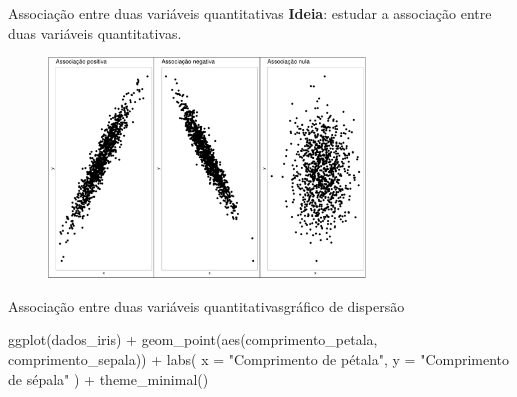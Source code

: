 \documentclass[
  10pt,
  ignorenonframetext,
]{beamer}
\newenvironment{Shaded}{\begin{snugshade}}{\end{snugshade}}
\newcommand{\AttributeTok}[1]{\textcolor[rgb]{0.40,0.45,0.13}{#1}}
\newcommand{\FunctionTok}[1]{\textcolor[rgb]{0.28,0.35,0.67}{#1}}
\newcommand{\NormalTok}[1]{\textcolor[rgb]{0.00,0.23,0.31}{#1}}
\newcommand{\SpecialCharTok}[1]{\textcolor[rgb]{0.37,0.37,0.37}{#1}}
\newcommand{\StringTok}[1]{\textcolor[rgb]{0.13,0.47,0.30}{#1}}
\begin{document}
\begin{frame}{Associação entre duas variáveis quantitativas}
\protect\hypertarget{associauxe7uxe3o-entre-duas-variuxe1veis-quantitativas}{}
\textbf{Ideia}: estudar a associação entre duas variáveis quantitativas.

\begin{figure}

{\centering \includegraphics[width=0.75\textwidth,height=\textheight]{exploracao-visualizacao_files/figure-beamer/unnamed-chunk-126-1.pdf}

}

\end{figure}
\end{frame}

\begin{frame}[fragile]{Associação entre duas variáveis
quantitativas\newline gráfico de dispersão}
\protect\hypertarget{associauxe7uxe3o-entre-duas-variuxe1veis-quantitativasgruxe1fico-de-dispersuxe3o}{}
\begin{Shaded}
\begin{Highlighting}[]
\FunctionTok{ggplot}\NormalTok{(dados\_iris) }\SpecialCharTok{+}
  \FunctionTok{geom\_point}\NormalTok{(}\FunctionTok{aes}\NormalTok{(comprimento\_petala, comprimento\_sepala)) }\SpecialCharTok{+}
  \FunctionTok{labs}\NormalTok{(}
    \AttributeTok{x =} \StringTok{"Comprimento de pétala"}\NormalTok{,}
    \AttributeTok{y =} \StringTok{"Comprimento de sépala"}
\NormalTok{  ) }\SpecialCharTok{+}
  \FunctionTok{theme\_minimal}\NormalTok{()}
\end{Highlighting}
\end{Shaded}
\end{frame}
\end{document}
